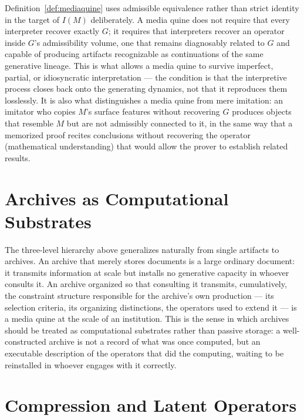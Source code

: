\documentclass[11pt]{book}
\begin{document}
Definition~\ref{def:mediaquine} uses admissible equivalence rather than strict identity in the target of $I(M)$ deliberately. A media quine does not require that every interpreter recover exactly $G$; it requires that interpreters recover an operator inside $G$'s admissibility volume, one that remains diagnosably related to $G$ and capable of producing artifacts recognizable as continuations of the same generative lineage. This is what allows a media quine to survive imperfect, partial, or idiosyncratic interpretation --- the condition is that the interpretive process closes back onto the generating dynamics, not that it reproduces them losslessly. It is also what distinguishes a media quine from mere imitation: an imitator who copies $M$'s surface features without recovering $G$ produces objects that resemble $M$ but are not admissibly connected to it, in the same way that a memorized proof recites conclusions without recovering the operator (mathematical understanding) that would allow the prover to establish related results.

\section{Archives as Computational Substrates}

The three-level hierarchy above generalizes naturally from single artifacts to archives. An archive that merely stores documents is a large ordinary document: it transmits information at scale but installs no generative capacity in whoever consults it. An archive organized so that consulting it transmits, cumulatively, the constraint structure responsible for the archive's own production --- its selection criteria, its organizing distinctions, the operators used to extend it --- is a media quine at the scale of an institution. This is the sense in which archives should be treated as computational substrates rather than passive storage: a well-constructed archive is not a record of what was once computed, but an executable description of the operators that did the computing, waiting to be reinstalled in whoever engages with it correctly.

\section{Compression and Latent Operators}
\end{document}
